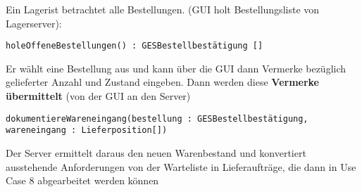 Ein Lagerist betrachtet alle Bestellungen. (GUI holt Bestellungsliste von Lagerserver):

\texttt{holeOffeneBestellungen() : GESBestellbestätigung []}

Er wählt eine Bestellung aus und kann über die GUI dann Vermerke bezüglich gelieferter Anzahl und Zustand eingeben. Dann werden diese \textbf{Vermerke übermittelt} (von der GUI an den Server)

\texttt{dokumentiereWareneingang(bestellung : GESBestellbestätigung, wareneingang : Lieferposition[])}

Der Server ermittelt daraus den neuen Warenbestand und konvertiert ausstehende Anforderungen von der Warteliste in Lieferaufträge, die dann in Use Case 8 abgearbeitet werden können